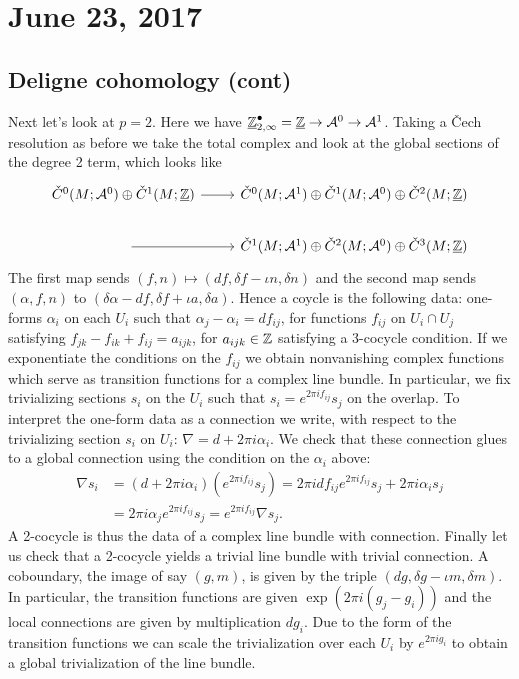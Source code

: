 \documentclass{amsart}
\begin{document}
\section{June 23, 2017}

\subsection{Deligne cohomology (cont)}
Next let's look at $p=2$. Here we have
$\underline{\mathbb{Z}}_{2,\infty}^\bullet=\underline{\mathbb{Z}}\to\mathcal{A}^0\to\mathcal{A}^1$.
Taking a \v Cech resolution as before we take the total complex and look at the
global sections of the degree 2 term, which looks like
\begin{equation*}
    \begin{tikzcd}
        \check C^0(M;\mathcal{A}^0) \oplus \check C^1(M;\underline{\Z}) \rar &
        \check C^0(M;\mathcal{A}^1)\oplus \check C^1(M;\mathcal{A}^0)\oplus
        \check C^2(M;\underline{\Z})\\
        \;\rar& \check C^1(M;\mathcal{A}^1)\oplus\check C^2(M;\mathcal{A}^0)\oplus
        \check C^3(M;\underline{\Z})
    \end{tikzcd}
\end{equation*}
The first map sends $(f, n)\mapsto (df, \delta f-\iota n, \delta n)$ and
the second map sends $(\alpha, f, n)$ to $(\delta\alpha-df,\delta f+\iota a,\delta a)$.
Hence a coycle is the following data: one-forms $\alpha_i$ on each $U_i$ such that
$\alpha_j-\alpha_i=df_{ij}$, for functions $f_{ij}$ on $U_i\cap U_j$ satisfying
$f_{jk}-f_{ik}+f_{ij}=a_{ijk}$, for $a_{ijk}\in\mathbb{Z}$ satisfying a 3-cocycle condition.
If we exponentiate the conditions on the $f_{ij}$ we obtain nonvanishing complex
functions which serve as transition functions for a complex line bundle. In
particular, we fix trivializing sections $s_i$ on the $U_i$ such that $s_i=e^{2\pi if_{ij}}s_j$
on the overlap. To interpret the one-form data as a connection we write, with
respect to the trivializing section $s_i$ on $U_i$: $\nabla = d + 2\pi i\alpha_i$.
We check that these connection glues to a global connection using the condition on
the $\alpha_i$ above:
\begin{align*}
    \nabla s_i &= (d+2\pi i\alpha_i)(e^{2\pi if_{ij}}s_j) = 2\pi i df_{ij} e^{2\pi if_{ij}} s_j + 2\pi i \alpha_is_j\\
    &= 2\pi i\alpha_j e^{2\pi if_{ij}}s_j = e^{2\pi if_{ij}}\nabla s_j.
\end{align*}
A 2-cocycle is thus the data of a complex line bundle with connection. Finally
let us check that a 2-cocycle yields a trivial line bundle with trivial connection.
A coboundary, the image of say $(g,m)$, is given by the triple $(dg, \delta g-\iota m,\delta m)$.
In particular, the transition functions are given $\exp(2\pi i(g_j-g_i))$
and the local connections are given by multiplication $dg_i$.
Due to the form of the transition functions we can scale the trivialization over each
$U_i$ by $e^{2\pi i g_i}$ to obtain a global trivialization of the line bundle.
\end{document}
